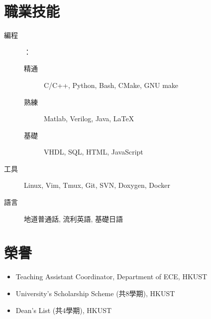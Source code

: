 \documentclass{mycv}
\begin{document}
\section{職業技能}

\begin{description}
	
  \item[編程]：
  \begin{description}
  	\item[精通] C/C++, Python, Bash, CMake, GNU make
    \item[熟練] Matlab, Verilog, Java, \LaTeX
    \item[基礎] VHDL, SQL, HTML, JavaScript
  \end{description}
  \item[工具] Linux, Vim, Tmux, Git, SVN, Doxygen, Docker %
  \item[語言] 地道普通話, 流利英語, 基礎日語
\end{description}

\section{榮譽}


\begin{itemize}
  \item Teaching Assistant Coordinator, Department of ECE, HKUST 
  \item University's Scholarship Scheme (共8學期), HKUST
  \item Dean's List (共4學期), HKUST
\end{itemize}
\end{document}

